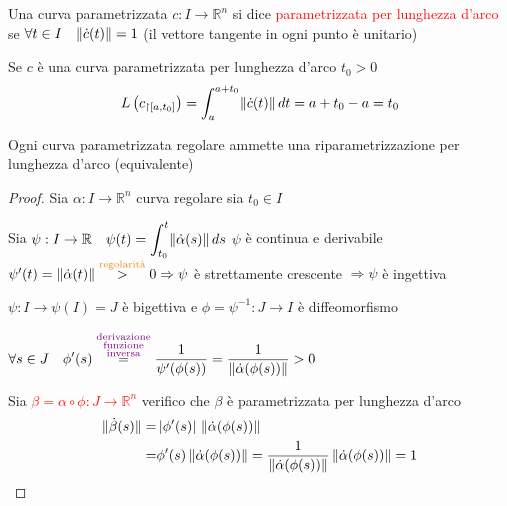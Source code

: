         \begin{definizione}
        Una curva parametrizzata $c: I \to \mathbb{R}^n$ si dice \textcolor{red}{parametrizzata per lunghezza d'arco} se \textcolor{red}{$\forall t \in I \quad \lVert\dot{c}(t)\rVert=1$} 
        \textcolor{blu}{(il vettore tangente in ogni punto è unitario)}
        \end{definizione}
        \begin{osservazione}
        Se $c$ è una curva parametrizzata per lunghezza d'arco $t_0 >0$
        \[ L \left(c_{\restriction{[a,t_0]}}\right) = \int_a^{a+t_0} \lVert\dot{c}(t)\rVert \, dt = a+t_0 - a = t_0 \]
        \end{osservazione}
        \begin{proposizione}
        \label{prop:esistenza_riparametrizzazione_lunghezza_arco}
        Ogni curva parametrizzata regolare ammette una riparametrizzazione per lunghezza d'arco \textcolor{blu}{(equivalente)}
        \end{proposizione}
        \begin{proof}
        Sia $\alpha : I \to \mathbb{R}^n$ curva regolare sia $t_0 \in I$

        Sia \textcolor{red}{$\displaystyle \psi:I \to \mathbb{R} \quad \psi(t)=\int_{t_0}^t \lVert\dot{\alpha}(s)\rVert \, ds$} $\psi$ è continua e derivabile
        $\psi'(t) = \lVert\dot{\alpha}(t)\rVert \overset{\textcolor{orange}{\text{regolarità}}}{>} 0 \Rightarrow \psi$ è strettamente crescente $\Rightarrow \psi$ è ingettiva

        $\psi: I \to \psi(I)=J$ è bigettiva e $\phi= \psi^{-1}:J \to I$ è diffeomorfismo

        $\displaystyle \forall s \in J \quad \phi'(s) \overset{\textcolor{violet}{\substack{\text{derivazione} \\ \text{funzione} \\ \text{inversa}}}}{=} 
        \frac{1}{\psi'(\phi(s))} = \frac{1}{\lVert\dot{\alpha}(\phi(s))\rVert}>0$

        Sia \textcolor{red}{$\beta = \alpha \circ \phi:J \to \mathbb{R}^n$} verifico che $\beta$ è parametrizzata per lunghezza d'arco
        \begin{align*}
        \lVert\dot{\beta}(s)\rVert =& \left|\phi'(s)\right| \, \lVert\dot{\alpha} (\phi(s))\rVert \\
        =& \phi'(s) \, \lVert\dot{\alpha} (\phi(s))\rVert = \frac{1}{\lVert\dot{\alpha}(\phi(s))\rVert} \, \lVert\dot{\alpha} (\phi(s))\rVert = 1
        \end{align*}
        \end{proof}
